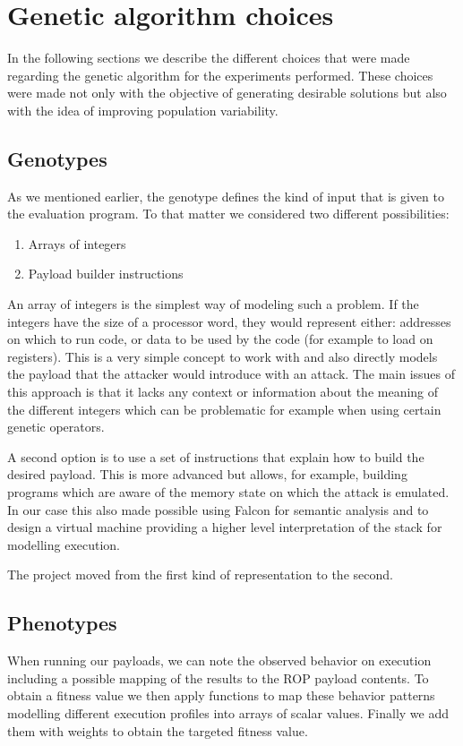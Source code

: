 \documentclass{article}
\begin{document}
\section{Genetic algorithm choices}
In the following sections we describe the different choices that were made regarding the genetic algorithm for the experiments performed. These choices were made not only with the objective of generating desirable solutions but also with the idea of improving population variability.

\subsection{Genotypes}
As we mentioned earlier, the genotype defines the kind of input that is given to the evaluation program. To that matter we considered two different possibilities:
\begin{enumerate}
    \item Arrays of integers
    \item Payload builder instructions
\end{enumerate}

An array of integers is the simplest way of modeling such a problem. If the integers have the size of a processor word, they would represent either: addresses on which to run code, or data to be used by the code (for example to load on registers). This is a very simple concept to work with and also directly models the payload that the attacker would introduce with an attack. The main issues of this approach is that it lacks any context or information about the meaning of the different integers which can be problematic for example when using certain genetic operators.

A second option is to use a set of instructions that explain how to build the desired payload. This is more advanced but allows, for example, building programs which are aware of the memory state on which the attack is emulated. In our case this also made possible using Falcon for semantic analysis and to design a virtual machine providing a higher level interpretation of the stack for modelling execution.

The project moved from the first kind of representation to the second.

\subsection{Phenotypes}
When running our payloads, we can note the observed behavior on execution including a possible mapping of the results to the ROP payload contents. To obtain a fitness value we then apply functions to map these behavior patterns modelling different execution profiles into arrays of scalar values. Finally we add them with weights to obtain the targeted fitness value.
\end{document}
